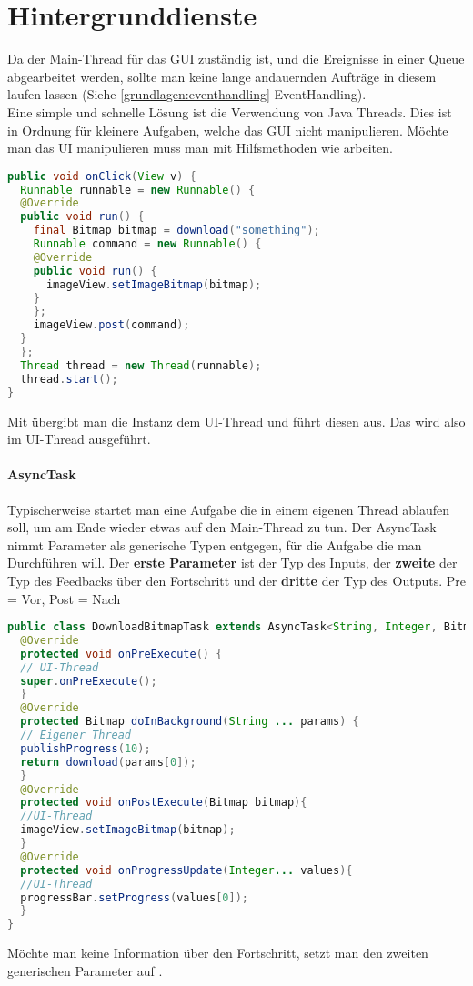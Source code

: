 \section{Hintergrunddienste}
Da der Main-Thread für das GUI zuständig ist, und die Ereignisse in einer Queue abgearbeitet werden, sollte man keine lange andauernden Aufträge in diesem laufen lassen (Siehe \autoref{grundlagen:eventhandling} EventHandling).\\
Eine simple und schnelle Lösung ist die Verwendung von Java Threads. Dies ist in Ordnung für kleinere Aufgaben, welche das GUI nicht manipulieren. Möchte man das UI manipulieren muss man mit Hilfsmethoden wie  arbeiten.
\begin{lstlisting}[language=java]
public void onClick(View v) {
  Runnable runnable = new Runnable() {
  @Override
  public void run() {
    final Bitmap bitmap = download("something");
    Runnable command = new Runnable() {
    @Override
    public void run() {
      imageView.setImageBitmap(bitmap);
    }
    };
    imageView.post(command);
  }
  };
  Thread thread = new Thread(runnable);
  thread.start();
}
\end{lstlisting}
Mit  übergibt man die  Instanz dem UI-Thread und führt diesen aus. Das  wird also im UI-Thread ausgeführt.
\paragraph{AsyncTask} Typischerweise startet man eine Aufgabe die in einem eigenen Thread ablaufen soll, um am Ende wieder etwas auf den Main-Thread zu tun. Der AsyncTask nimmt Parameter als generische Typen entgegen, für die Aufgabe die man Durchführen will. Der \textbf{erste Parameter} ist der Typ des Inputs, der \textbf{zweite} der Typ des Feedbacks über den Fortschritt und der \textbf{dritte} der Typ des Outputs. Pre = Vor, Post = Nach
\begin{lstlisting}[language=java]
public class DownloadBitmapTask extends AsyncTask<String, Integer, Bitmap> {
  @Override
  protected void onPreExecute() {
  // UI-Thread
  super.onPreExecute();
  }
  @Override
  protected Bitmap doInBackground(String ... params) {
  // Eigener Thread
  publishProgress(10);
  return download(params[0]);
  }
  @Override
  protected void onPostExecute(Bitmap bitmap){
  //UI-Thread
  imageView.setImageBitmap(bitmap);
  }
  @Override
  protected void onProgressUpdate(Integer... values){
  //UI-Thread
  progressBar.setProgress(values[0]);
  }
}
\end{lstlisting}
Möchte man keine Information über den Fortschritt, setzt man den zweiten generischen Parameter auf .
